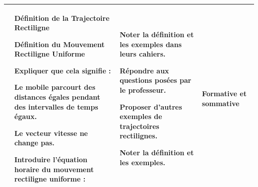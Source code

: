 \documentclass[14pt]{article}
\begin{document}
\begin{center}
\begin{tabular}{|p{}||p{}||p{}||p{}|}
&
 Définition de la Trajectoire Rectiligne

 Définition du Mouvement Rectiligne Uniforme

 Expliquer que cela signifie :

Le mobile parcourt des distances égales pendant des intervalles de temps égaux.

Le vecteur vitesse ne change pas.

Introduire l’équation horaire du mouvement rectiligne uniforme :


& 

Noter la définition et les exemples dans leurs cahiers.

Répondre aux questions posées par le professeur.

Proposer d'autres exemples de trajectoires rectilignes.

Noter la définition et les exemples.


&Formative et sommative
\\\hline





\end{tabular}
\end{center}
\end{document}
